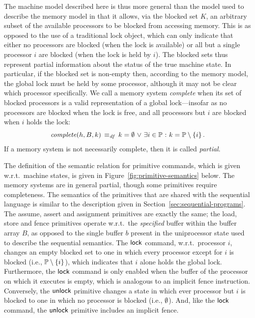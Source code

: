 \documentclass[11pt]{report}
\begin{document}

The machine model described here is thus more general than the model used to describe the memory model in that it allows, via the blocked set $K$, an arbitrary subset of the available processors to be blocked from accessing memory. This is as opposed to the use of a traditional lock object, which can only indicate that either no processors are blocked (when the lock is available) or all but a single processor $i$ are blocked (when the lock is held by $i$). The blocked sets thus represent partial information about the status of the true machine state. In particular, if the blocked set is non-empty then, according to the memory model, the global lock must be held by some processor, although it may not be clear which processor specifically. We call a memory system \emph{complete} when its set of blocked processors is a valid representation of a global lock---insofar as no processors are blocked when the lock is free, and all processors but $i$ are blocked when $i$ holds the lock: \[ \mathit{complete}(h,B,k) \operatorname{\;\equiv_{\mathit{df}}\;} k = \operatorname{\emptyset} \operatorname{\,\vee\,} \exists i \in \mathbb{P} \operatorname{\,:\,} k = \mathbb{P} \setminus \left\lbrace i \right\rbrace.\] If a memory system is not necessarily complete, then it is called \emph{partial}.

The definition of the semantic relation for primitive commands, which is given w.r.t.\ machine states, is given in Figure~\ref{fig:primitive-semantics} below. The memory systems are in general partial, though some primitives require completeness. The semantics of the primitives that are shared with the sequential language is  similar to the description given in Section~\ref{sec:sequential-programs}. The assume, assert and assignment primitives are exactly the same; the load, store and fence primitives operate w.r.t.\ the \emph{specified} buffer within the buffer array $B$, as opposed to the single buffer $b$ present in the uniprocessor state used to describe the sequential semantics. The $\operatorname{\mathsf{lock}}$ command, w.r.t.\ processor $i$, changes an empty blocked set to one in which every processor except for $i$ is blocked (i.e., $\mathbb{P} \setminus \left\lbrace i \right\rbrace$), which indicates that $i$ alone holds the global lock. Furthermore, the $\operatorname{\mathsf{lock}}$ command is only enabled when the buffer of the processor on which it executes is empty, which is analogous to an implicit fence instruction. Conversely, the $\operatorname{\mathsf{unlock}}$ primitive changes a state in which ever processor but $i$ is blocked to one in which no processor is blocked (i.e., $\operatorname{\emptyset}$). And, like the $\operatorname{\mathsf{lock}}$ command, the $\operatorname{\mathsf{unlock}}$ primitive includes an implicit fence. 
\end{document}
